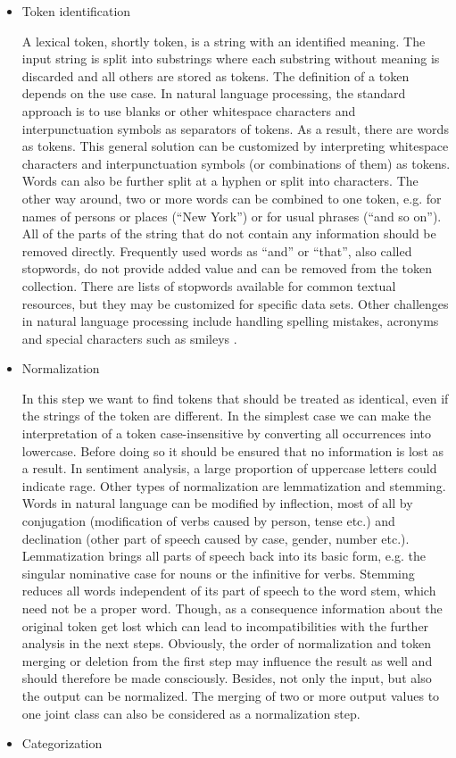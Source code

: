 \documentclass[article,type=msc,colorback,accentcolor=tud7b]{tudthesis}
\begin{document}
    \begin{itemize}
      \item Token identification
      
        A lexical token, shortly token, is a string with an identified meaning. The input string is split into substrings where each substring without meaning is discarded and all others are stored as tokens. The definition of a token depends on the use case. In natural language processing, the standard approach is to use blanks or other whitespace characters and interpunctuation symbols as separators of tokens. As a result, there are words as tokens. This general solution can be customized by interpreting whitespace characters and interpunctuation symbols (or combinations of them) as tokens. Words can also be further split at a hyphen or split into characters. The other way around, two or more words can be combined to one token, e.g. for names of persons or places (“New York”) or for usual phrases (“and so on”). All of the parts of the string that do not contain any information should be removed directly. Frequently used words as “and” or “that”, also called stopwords, do not provide added value and can be removed from the token collection. There are lists of stopwords available for common textual resources, but they may be customized for specific data sets. Other challenges in natural language processing include handling spelling mistakes, acronyms and special characters such as smileys \autocite{Kharde2016}.
      \item Normalization
      
        In this step we want to find tokens that should be treated as identical, even if the strings of the token are different. In the simplest case we can make the interpretation of a token case-insensitive by converting all occurrences into lowercase. Before doing so it should be ensured that no information is lost as a result. In sentiment analysis, a large proportion of uppercase letters could indicate rage. Other types of normalization are lemmatization and stemming. Words in natural language can be modified by inflection, most of all by conjugation (modification of verbs caused by person, tense etc.) and declination (other part of speech caused by case, gender, number etc.). Lemmatization brings all parts of speech back into its basic form, e.g. the singular nominative case for nouns or the infinitive for verbs. Stemming reduces all words independent of its part of speech to the word stem, which need not be a proper word. Though, as a consequence information about the original token get lost which can lead to incompatibilities with the further analysis in the next steps. Obviously, the order of normalization and token merging or deletion from the first step may influence the result as well and should therefore be made consciously. Besides, not only the input, but also the output can be normalized. The merging of two or more output values to one joint class can also be considered as a normalization step.
      \item Categorization
      

\end{itemize}
\end{document}

